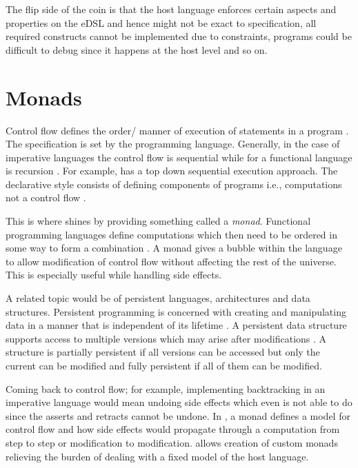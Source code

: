 \documentclass[thesis-solanki.tex]{subfiles}
\begin{document}
  The flip side of the coin is that the host language enforces certain aspects and properties on the eDSL and hence
  might not be exact to specification, all required constructs cannot be implemented due to constraints, programs
  could be difficult to debug since it happens at the host level and so on.


\section{Monads}
Control flow defines the order/ manner of execution of statements in a pro\-gram \cite{website:controlflowwiki}.
The specification is set by the programming language.
Generally, in the case of imperative languages the control flow is sequential while for a functional language is
recursion \cite{website:controlflowdalhousie}.
For example,  has a top down sequential execution approach.
The declarative style consists of defining components of programs i.e.,
computations not a control flow \cite{website:declarativeprogrammingwiki}.

This is where  shines by providing something called a \textit{monad}.
Functional programming languages
define computations which then need to be ordered in some way to form a
combination \cite{website:monadascomputation}.
A monad gives a bubble within the language to allow modification of control flow without affecting the rest of the
universe.
This is especially useful while handling side effects.

A related topic would be of persistent languages, architectures and data structures.
Persistent programming is concerned with creating and manipulating data in a manner that is independent of its
lifetime \cite{morrison1990persistent}.
A persistent data structure supports access to multiple versions which may arise after modifications
\cite{driscoll1986making, website:persistentdatastructuresmit}.
A structure is partially persistent if all versions can be accessed but only the current can be modified and fully
persistent if all of them can be modified.

Coming back to control flow; for example, implementing backtracking in an imperative language would mean undoing
side effects which even  is not able to do since the asserts and retracts cannot be undone.
In , a monad defines a model for control flow and how side effects would propagate through a
computation from step to step or modification to modification.
 allows creation of custom monads relieving the burden of dealing with a fixed model of the
host language.
\end{document}
